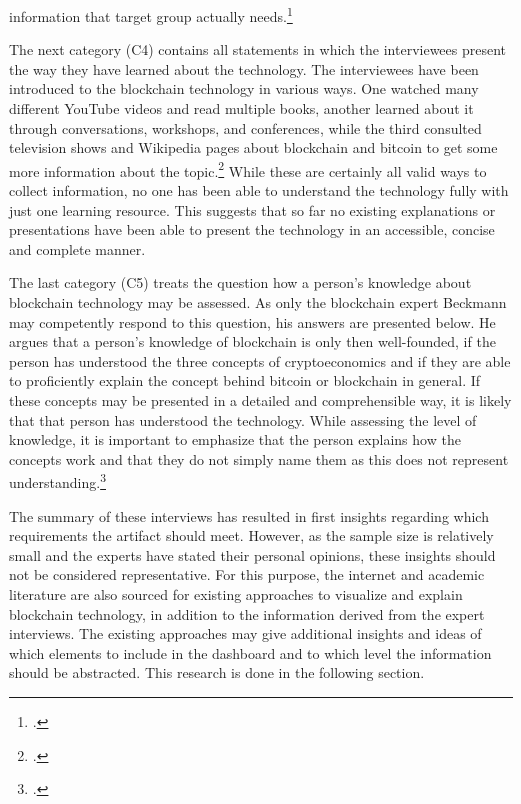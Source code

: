 information that target group actually needs.\footcites[Cf.][P80, P81, P87]{BjoernPaulewicz_Interview}[cf.][P120]{RalphBeckmann_Interview}

The next category (C4) contains all statements in which the interviewees present the way they have learned about the technology. The interviewees have been introduced to the blockchain technology in various ways. One watched many different YouTube videos and read multiple books, another learned about it through conversations, workshops, and conferences, while the third consulted television shows and Wikipedia pages about blockchain and bitcoin to get some more information about the topic.\footcites[Cf.][P6]{BjoernPaulewicz_Interview}[cf.][P72, P90]{BjoernPaulewicz_Interview}[cf.][P93, P94, P101]{RalphBeckmann_Interview} While these are certainly all valid ways to collect information, no one has been able to understand the technology fully with just one learning resource. This suggests that so far no existing explanations or presentations have been able to present the technology in an accessible, concise and complete manner.

The last category (C5) treats the question how a person's knowledge about blockchain technology may be assessed. As only the blockchain expert Beckmann may competently respond to this question, his answers are presented below. He argues that a person's knowledge of blockchain is only then well-founded, if the person has understood the three concepts of cryptoeconomics and if they are able to proficiently explain the concept behind bitcoin or blockchain in general. If these concepts may be presented in a detailed and comprehensible way, it is likely that that person has understood the technology. While assessing the level of knowledge, it is important to emphasize that the person explains how the concepts work and that they do not simply name them as this does not represent understanding.\footcites[Cf.][P100, P102, P108, P111, P118, P129, P130]{RalphBeckmann_Interview}

The summary of these interviews has resulted in first insights regarding which requirements the artifact should meet. However, as the sample size is relatively small and the experts have stated their personal opinions, these insights should not be considered representative. For this purpose, the internet and academic literature are also sourced for existing approaches to visualize and explain blockchain technology, in addition to the information derived from the expert interviews. The existing approaches may give additional insights and ideas of which elements to include in the dashboard and to which level the information should be abstracted. This research is done in the following section.

